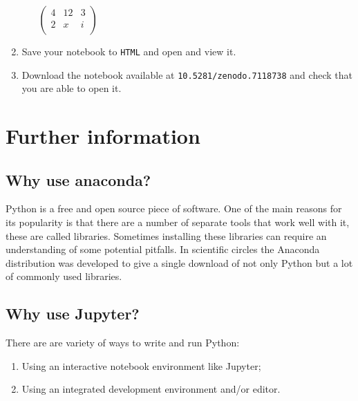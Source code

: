 \begin{enumerate}
\begin{enumerate}
\(\begin{pmatrix}4 & 12 & 3\\2 & x & i\\\end{pmatrix}\)

\end{enumerate}

\item 

Save your notebook to \texttt{HTML} and open and view it.

\item 

Download the notebook available at
\texttt{10.5281/zenodo.7118738} and
check that you are able to open it.

\end{enumerate}
\section{Further information}

\subsection{Why use anaconda?}\label{sec:why_use_anaconda}

Python is a free and open source piece of software. One of the main reasons for
its popularity is that there are a number of separate tools that work well with
it, these are called libraries. Sometimes installing these libraries can require
an understanding of some potential pitfalls. In scientific circles the Anaconda
distribution was developed to give a single download of not only Python but a
lot of commonly used libraries.

\subsection{Why use Jupyter?}

There are are variety of ways to write and run Python:
\begin{enumerate}

\item 

Using an interactive notebook environment like Jupyter;

\item 

Using an integrated development environment and/or editor.

\end{enumerate}


